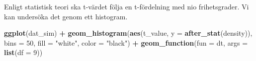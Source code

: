 \documentclass[
]{book}
\newenvironment{Shaded}{\begin{snugshade}}{\end{snugshade}}
\newcommand{\AttributeTok}[1]{\textcolor[rgb]{0.13,0.29,0.53}{#1}}
\newcommand{\ControlFlowTok}[1]{\textcolor[rgb]{0.13,0.29,0.53}{\textbf{#1}}}
\newcommand{\DecValTok}[1]{\textcolor[rgb]{0.00,0.00,0.81}{#1}}
\newcommand{\FunctionTok}[1]{\textcolor[rgb]{0.13,0.29,0.53}{\textbf{#1}}}
\newcommand{\NormalTok}[1]{#1}
\newcommand{\OtherTok}[1]{\textcolor[rgb]{0.56,0.35,0.01}{#1}}
\newcommand{\SpecialCharTok}[1]{\textcolor[rgb]{0.81,0.36,0.00}{\textbf{#1}}}
\newcommand{\StringTok}[1]{\textcolor[rgb]{0.31,0.60,0.02}{#1}}
\theoremstyle{definition}
\theoremstyle{definition}
\theoremstyle{definition}
\theoremstyle{definition}
\theoremstyle{remark}
\begin{document}
\begin{Shaded}
\end{Shaded}

Enligt statistisk teori ska t-värdet följa en t-fördelning med nio frihetsgrader. Vi kan undersöka det genom ett histogram.

\begin{Shaded}
\begin{Highlighting}[]
\FunctionTok{ggplot}\NormalTok{(dat\_sim) }\SpecialCharTok{+}
  \FunctionTok{geom\_histogram}\NormalTok{(}\FunctionTok{aes}\NormalTok{(t\_value, }\AttributeTok{y =} \FunctionTok{after\_stat}\NormalTok{(density)), }
                 \AttributeTok{bins =} \DecValTok{50}\NormalTok{, }
                 \AttributeTok{fill =} \StringTok{"white"}\NormalTok{, }\AttributeTok{color =} \StringTok{"black"}\NormalTok{) }\SpecialCharTok{+}
  \FunctionTok{geom\_function}\NormalTok{(}\AttributeTok{fun =}\NormalTok{ dt, }\AttributeTok{args =} \FunctionTok{list}\NormalTok{(}\AttributeTok{df =} \DecValTok{9}\NormalTok{))}
\end{Highlighting}
\end{Shaded}
\end{document}
